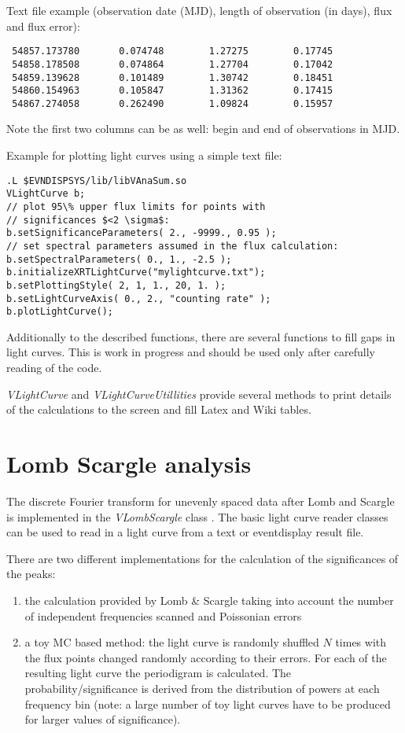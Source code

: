 \documentclass[titlepage,a4paper,twoside,11pt]{report}
\begin{document}
Text file example (observation date (MJD), length of observation (in days), flux and flux error):

\begin{lstlisting}
 54857.173780       0.074748        1.27275        0.17745  
 54858.178508       0.074864        1.27704        0.17042  
 54859.139628       0.101489        1.30742        0.18451  
 54860.154963       0.105847        1.31362        0.17415  
 54867.274058       0.262490        1.09824        0.15957  
\end{lstlisting}

Note the first two columns can be as well: begin and end of observations in MJD.

Example for plotting light curves using a simple text file:

\begin{lstlisting}
.L $EVNDISPSYS/lib/libVAnaSum.so 
VLightCurve b;
// plot 95\% upper flux limits for points with 
// significances $<2 \sigma$:
b.setSignificanceParameters( 2., -9999., 0.95 );
// set spectral parameters assumed in the flux calculation:
b.setSpectralParameters( 0., 1., -2.5 );
b.initializeXRTLightCurve("mylightcurve.txt");
b.setPlottingStyle( 2, 1, 1., 20, 1. );
b.setLightCurveAxis( 0., 2., "counting rate" );
b.plotLightCurve();
\end{lstlisting}

Additionally to the described functions, there are several functions to fill gaps in light curves. 
This is work in progress and should be used only after carefully reading of the code.

{\it VLightCurve} and {\it VLightCurveUtillities} provide several methods to print details of the calculations to the screen and fill Latex and Wiki tables.

\section{Lomb Scargle analysis}

The discrete Fourier transform for unevenly spaced data  after Lomb and Scargle is implemented in the {\it VLombScargle} class \cite{Scargle-1982}. 
The basic light curve reader classes can be used to read in a light curve from a text or eventdisplay result file.

There are two different implementations for the calculation of the significances of the peaks:
\begin{enumerate}
\item the calculation provided by Lomb \& Scargle taking into account the number of independent frequencies scanned and Poissonian errors
\item a toy MC based method: the light curve is randomly shuffled $N$ times with the flux points changed randomly according to their errors. For each of the resulting light curve the periodigram is calculated. The probability/significance is derived from the distribution of powers at each frequency bin (note: a large number of toy light curves have to be produced for larger values of significance).
\end{enumerate}
\end{document}
